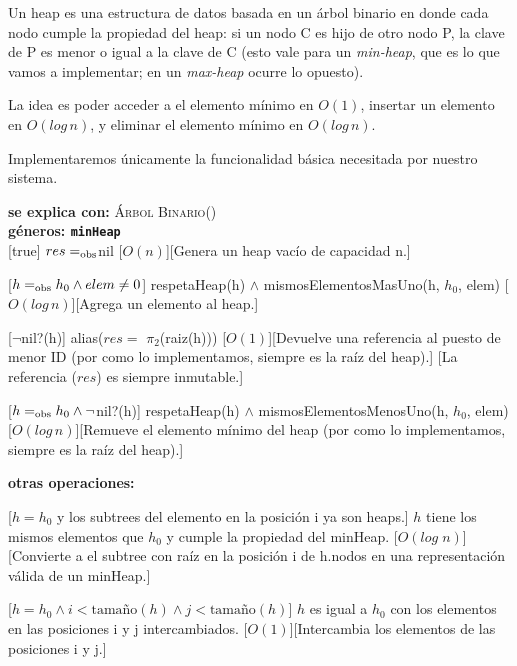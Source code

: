 \documentclass[../main.tex]{subfiles}
\begin{document}
Un heap es una estructura de datos basada en un árbol binario en donde cada nodo cumple la propiedad del heap: si un nodo C es hijo
de otro nodo P, la clave de P es menor o igual a la clave de C (esto vale para un \textit{min-heap}, que es lo que vamos a 
implementar; en un \textit{max-heap} ocurre lo opuesto).

La idea es poder acceder a el elemento mínimo en $O(1)$, insertar un elemento en $O(log\, n)$, y eliminar el elemento mínimo en $O(log \,n)$.

Implementaremos únicamente la funcionalidad básica necesitada por nuestro sistema.

\begin{interfaz} 
\textbf{se explica con: }\textsc{Árbol Binario(\tupPuesto)} \\
\textbf{géneros: \texttt{minHeap}} \\

[true]
{$res =_{\mathrm{obs}} $nil}
[$O(n)$][Genera un heap vacío de capacidad n.]   

[$h =_{\mathrm{obs}} h_0 \land elem \neq 0$]
{respetaHeap(h) $\land$ mismosElementosMasUno(h, $h_0$, elem)}
[$O(log\,n)$][Agrega un elemento al heap.] 

[$\neg$nil?(h)]
{alias($res =$ $\pi_2$(raiz(h)))}
[$O(1)$][Devuelve una referencia al puesto de menor ID (por como lo implementamos, siempre es la raíz del heap).]
[La referencia ($res$) es siempre inmutable.]

[$h =_{\mathrm{obs}} h_0 \land \neg$nil?(h)]
{respetaHeap(h) $\land$ mismosElementosMenosUno(h, $h_0$, elem)}
[$O(log\,n)$][Remueve el elemento mínimo del heap (por como lo implementamos, siempre es la raíz del heap).]

\textbf{otras operaciones: }

[$h = h_0$ y los subtrees del elemento en la posición i ya son heaps.]
{$h$ tiene los mismos elementos que $h_0$ y cumple la propiedad del minHeap.}
[$O(log \;n)$][Convierte a el subtree con raíz en la posición i de h.nodos en una representación válida de un minHeap.]

[$h = h_0 \land i < \text{tamaño}(h) \land j < \text{tamaño}(h)$]
{$h$ es igual a $h_0$ con los elementos en las posiciones i y j intercambiados.}
[$O(1)$][Intercambia los elementos de las posiciones i y j.]


\end{interfaz}
\end{document}
